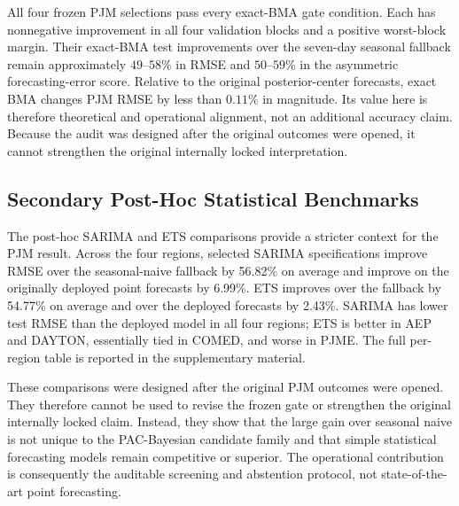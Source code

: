 All four frozen PJM selections pass every exact-BMA gate condition. Each has
nonnegative improvement in all four validation blocks and a positive
worst-block margin. Their exact-BMA test improvements over the seven-day
seasonal fallback remain approximately $49$--$58\%$ in RMSE and
$50$--$59\%$ in the asymmetric forecasting-error score. Relative to the
original posterior-center forecasts, exact BMA changes PJM RMSE by less than
$0.11\%$ in magnitude. Its value here is therefore theoretical and
operational alignment, not an additional accuracy claim. Because the audit
was designed after the original outcomes were opened, it cannot strengthen
the original internally locked interpretation.

\subsection{Secondary Post-Hoc Statistical Benchmarks}
The post-hoc SARIMA and ETS comparisons provide a stricter context for the PJM result. Across the four regions, selected SARIMA specifications improve RMSE over the seasonal-naive fallback by 56.82\% on average and improve on the originally deployed point forecasts by 6.99\%. ETS improves over the fallback by 54.77\% on average and over the deployed forecasts by 2.43\%. SARIMA has lower test RMSE than the deployed model in all four regions; ETS is better in AEP and DAYTON, essentially tied in COMED, and worse in PJME. The full per-region table is reported in the supplementary material.

These comparisons were designed after the original PJM outcomes were opened. They therefore cannot be used to revise the frozen gate or strengthen the original internally locked claim. Instead, they show that the large gain over seasonal naive is not unique to the PAC-Bayesian candidate family and that simple statistical forecasting models remain competitive or superior. The operational contribution is consequently the auditable screening and abstention protocol, not state-of-the-art point forecasting.

